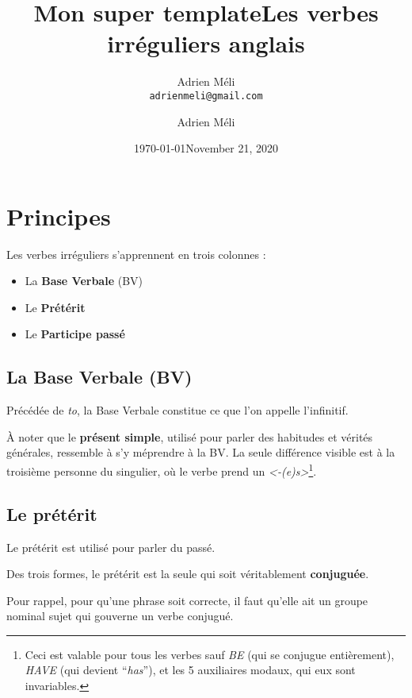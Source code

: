 \documentclass[
  10pt,
]{article}
\title{Mon super template}
\author{Adrien M\'{e}li\\{\tt adrienmeli@gmail.com}}
\date{\today}
\title{Les verbes irréguliers anglais}
\author{Adrien Méli}
\date{November 21, 2020}
\begin{document}
\maketitle

\pagestyle{fancy}

\hypertarget{principes}{%
\section{Principes}\label{principes}}

Les verbes irréguliers s'apprennent en trois colonnes :

\begin{itemize}
\item
  La \textbf{Base Verbale} (BV)
\item
  Le \textbf{Prétérit}
\item
  Le \textbf{Participe passé}
\end{itemize}

\hypertarget{la-base-verbale-bv}{%
\subsection{La Base Verbale (BV)}\label{la-base-verbale-bv}}

Précédée de \emph{to}, la Base Verbale constitue ce que l'on appelle l'infinitif.

À noter que le \textbf{présent simple}, utilisé pour parler des habitudes et vérités générales, ressemble à s'y méprendre à la BV.
La seule différence visible est à la troisième personne du singulier, où le verbe prend un \emph{\textless-(e)s\textgreater{}}\footnote{Ceci est valable pour tous les verbes sauf \emph{BE} (qui se conjugue entièrement), \emph{HAVE} (qui devient ``\emph{has}''), et les 5 auxiliaires modaux, qui eux sont invariables.}.

\hypertarget{le-pruxe9tuxe9rit}{%
\subsection{Le prétérit}\label{le-pruxe9tuxe9rit}}

Le prétérit est utilisé pour parler du passé.

Des trois formes, le prétérit est la seule qui soit véritablement \textbf{conjuguée}.

Pour rappel, pour qu'une phrase soit correcte, il faut qu'elle ait un groupe nominal sujet qui gouverne un verbe conjugué.
\end{document}

